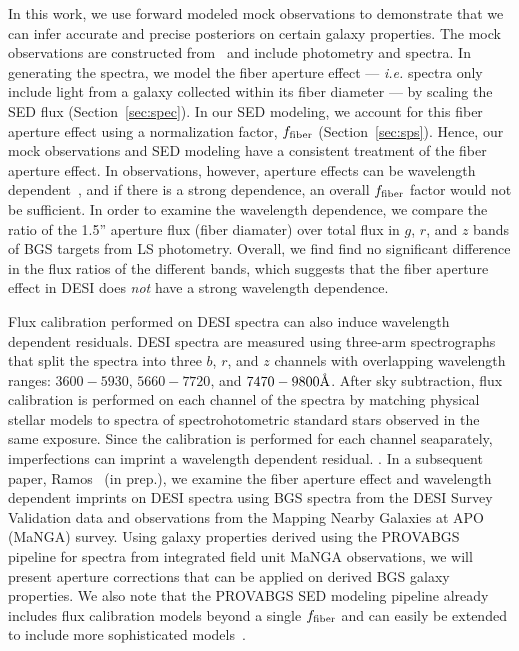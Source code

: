 
In this work, we use forward modeled mock observations to demonstrate that we
can infer accurate and precise posteriors on certain galaxy properties.
The mock observations are constructed from \lgal~and include photometry and
spectra. 
In generating the spectra, we model the fiber aperture effect --- \emph{i.e.}
spectra only include light from a galaxy collected within its fiber diameter 
--- by scaling the SED flux (Section~\ref{sec:spec}).
In our SED modeling, we account for this fiber aperture effect using a
normalization factor, $f_{\rm fiber}$ (Section~\ref{sec:sps}). 
Hence, our mock observations and SED modeling have a consistent treatment of
the fiber aperture effect. 
In observations, however, aperture effects can be wavelength
dependent~\citep{gerssen2012, richards2016}, and if there is a strong
dependence, an overall $f_{\rm fiber}$ factor would not be sufficient.
In order to examine the wavelength dependence, we compare the ratio of the
1.5'' aperture flux (fiber diamater) over total flux in $g$, $r$, and $z$ bands
of BGS targets from LS photometry.
Overall, we find find no significant difference in the flux ratios of the different
bands, which suggests that the fiber aperture effect in DESI does \emph{not}
have a strong wavelength dependence. 

Flux calibration performed on DESI spectra can also induce wavelength dependent
residuals. 
DESI spectra are measured using three-arm spectrographs that split the spectra
into three $b$, $r$, and $z$ channels with overlapping wavelength ranges: 
$3600 - 5930$, $5660 - 7720$, and $7470 - 9800 \AA$.  
After sky subtraction, flux calibration is performed on each channel of the
spectra by matching physical stellar models to spectra of spectrohotometric
standard stars observed in the same exposure. 
Since the calibration is performed for each channel seaparately, imperfections
can imprint a wavelength dependent residual. 
.
In a subsequent paper, Ramos \etal~(in prep.), we examine the fiber aperture
effect and wavelength dependent imprints on DESI spectra using BGS
spectra from the DESI Survey Validation data and observations from the Mapping
Nearby Galaxies at APO (MaNGA) survey. 
Using galaxy properties derived using the {\sc PROVABGS} pipeline for spectra
from integrated field unit MaNGA observations, we will present aperture
corrections that can be applied on derived BGS galaxy properties. 
We also note that the {\sc PROVABGS} SED modeling pipeline already includes flux
calibration models beyond a single $f_{\rm fiber}$ and can easily be extended
to include more sophisticated models~\citep[\emph{e.g.} Chebyschev
polynomial][]{carnall2017, tacchella2021}. 


